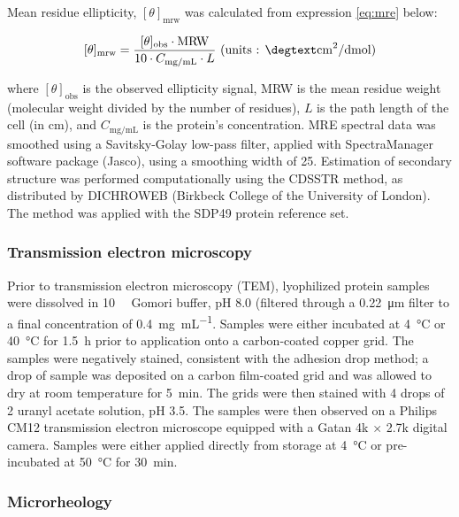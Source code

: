 \begin{refsection}
Mean residue ellipticity, $[\theta]_{\mathrm{mrw}}$ was calculated from
expression \ref{eq:mre} below:

\begin{equation}
    \label{eq:mre}
    [\theta]_{\text{mrw}}=
    \frac{[\theta]_{\text{obs}}\cdot\text{MRW}}{10\cdot{C_\text{mg/mL}}\cdot{L}}
    \text{ (units : \si{\degtext\cm\squared\per\deci\mol})}
\end{equation}

where $[\theta]_{\text{obs}}$ is the observed ellipticity signal, MRW is the
mean residue weight (molecular weight divided by the number of residues), $L$ is
the path length of the cell (in cm), and $C_\text{mg/mL}$ is the protein's
concentration.\cite{Martin2008} MRE spectral data was smoothed using a
Savitsky-Golay low-pass filter, applied with SpectraManager software package
(Jasco), using a smoothing width of 25.\cite{Savitzky1964} Estimation of
secondary structure was performed computationally using the CDSSTR method, as
distributed by DICHROWEB (Birkbeck College of the University of
London).\cite{Whitmore2008} The method was applied with the SDP49 protein
reference set.\cite{Sreerama2000a,Sreerama2000b}

\subsubsection{Transmission electron microscopy}
\label{sec:TEM_method}
Prior to transmission electron microscopy (TEM), lyophilized protein samples
were dissolved in \SI{10}{\milli\moLar} Gomori buffer, pH 8.0 (filtered through
a \SI{0.22}{\um} filter to a final concentration of \SI{0.4}{\mg\per\mL}.
Samples were either incubated at \SI{4}{\celsius} or \SI{40}{\celsius} for
\SI{1.5}{\hour} prior to application onto a carbon-coated copper grid. The
samples were negatively stained, consistent with the adhesion drop method; a
drop of sample was deposited on a carbon film-coated grid and was allowed to dry
at room temperature for \SI{5}{\minute}. The grids were then stained with 4 drops
of \SI{2}{\volper} uranyl acetate solution, pH 3.5. The samples were then
observed on a Philips CM12 transmission electron microscope equipped with a
Gatan 4k ${\times}$ 2.7k digital camera. Samples were either applied directly
from storage at \SI{4}{\celsius} or pre-incubated at \SI{50}{\celsius} for
\SI{30}{\minute}.
\subsubsection{Microrheology}


\end{refsection}
